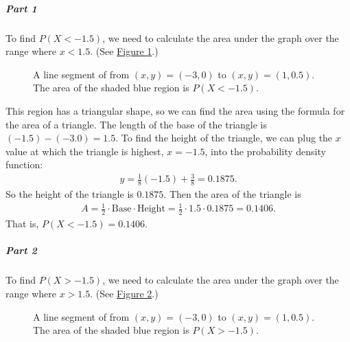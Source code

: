 \documentclass[letterpaper,10pt,english]{jupyterBook}
\begin{document}
\subparagraph{Part 1}
\label{\detokenize{Ch3 Probability/3.7 Continuous Probability Distributions:id6}}
\sphinxAtStartPar
To find \(P(X < -1.5)\), we need to calculate the area under the graph over the range where \(x < 1.5\). (See \hyperref[\detokenize{Ch3 Probability/3.7 Continuous Probability Distributions:pdf-tri2-area1}]{Figure \ref{\detokenize{Ch3 Probability/3.7 Continuous Probability Distributions:pdf-tri2-area1}}}.)

\begin{figure}[htbp]
\centering
\capstart

\noindent{}
\caption{A line segment of from \((x, y) = (-3, 0)\) to \((x, y) = (1, 0.5)\). The area of the shaded blue region is \(P(X < -1.5)\).}\label{\detokenize{Ch3 Probability/3.7 Continuous Probability Distributions:pdf-tri2-area1}}\end{figure}

\sphinxAtStartPar
This region has a triangular shape, so we can find the area using the formula for the area of a triangle. The length of the base of the triangle is \((-1.5) - (-3.0) = 1.5\). To find the height of the triangle, we can plug the \(x\)\sphinxhyphen{}value at which the triangle is highest, \(x = -1.5\), into the probability density function:
\begin{equation*}
\begin{split} y = \frac{1}{8}(-1.5) + \frac{3}{8} = 0.1875. \end{split}
\end{equation*}
\sphinxAtStartPar
So the height of the triangle is \(0.1875\). Then the area of the triangle is
\begin{equation*}
\begin{split} A = \frac{1}{2} \cdot \text{Base} \cdot \text{Height} = \frac{1}{2} \cdot 1.5 \cdot 0.1875 = 0.1406. \end{split}
\end{equation*}
\sphinxAtStartPar
That is, \(P(X < -1.5) = 0.1406\).


\subparagraph{Part 2}
\label{\detokenize{Ch3 Probability/3.7 Continuous Probability Distributions:id7}}
\sphinxAtStartPar
To find \(P(X > -1.5)\), we need to calculate the area under the graph over the range where \(x > 1.5\). (See \hyperref[\detokenize{Ch3 Probability/3.7 Continuous Probability Distributions:pdf-tri2-area2}]{Figure \ref{\detokenize{Ch3 Probability/3.7 Continuous Probability Distributions:pdf-tri2-area2}}}.)

\begin{figure}[htbp]
\centering
\capstart

\noindent{}
\caption{A line segment of from \((x, y) = (-3, 0)\) to \((x, y) = (1, 0.5)\). The area of the shaded blue region is \(P(X > -1.5)\).}\label{\detokenize{Ch3 Probability/3.7 Continuous Probability Distributions:pdf-tri2-area2}}\end{figure}
\end{document}
